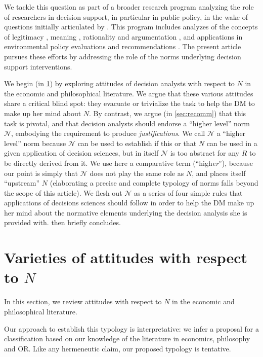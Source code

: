 \documentclass[preprint, french, english, 11pt, authoryear]{elsarticle}%
\newcommand{\protectforpdf}[1]{\texorpdfstring{\ensuremath{#1}}{#1}}
\newcommand{\adv}{\mathscr{N}}
\begin{document}
\begin{changebar}
We tackle this question as part of a broader research program analyzing the role of researchers in decision support, in particular in public policy, in the wake of questions initially articulated by \citet{tsoukias_policy_2013}.
This program includes analyzes of the concepts of legitimacy \citep{meinard_what_2017}, meaning \citep{meinard_utility_2018}, rationality \citep{meinard_rationality_2019} and argumentation \citep{cailloux_formal_2018}, 
and applications in environmental policy evaluations \citep{jeanmougin_mismatch_2017} and recommendations \citep{choulak_meta-decision-analysis_2019}.
The present article pursues these efforts by addressing the role of the norms underlying decision support interventions.\end{changebar}

We begin (in \cref{sec:existing}) by exploring attitudes of decision analysts with respect to $N$ in the economic and philosophical literature. 
We argue that these various attitudes share a critical blind spot: they evacuate or trivialize the task to help the \ac{DM} to make up her mind about $N$. 
By contrast, we argue (in \cref{sec:recomm}) that this task is pivotal, and that decision analysts should endorse a “higher level” norm $\adv$, embodying the requirement to produce \emph{justifications}. 
We call $\adv$ a “higher level” norm because $\adv$ can be used to establish if this or that $N$ can be used in a given application of decision sciences, but in itself $\adv$ is too abstract for any $R$ to be directly derived from it.
We use here a comparative term (“high\emph{er}”), because our point is simply that $\adv$ does not play the same role as $N$, and places itself “upstream” $N$ (elaborating a precise and complete typology of norms falls beyond the scope of this article).
We flesh out $\adv$ as a series of four simple rules that applications of decisions sciences should follow in order to help the \ac{DM} make up her mind about the normative elements underlying the decision analysis she is provided with.  then briefly concludes.

\section{Varieties of attitudes with respect to \protectforpdf{N}}
\label{sec:existing}
In this section, we review attitudes with respect to $N$ in the economic and philosophical literature.
\begin{changebar}
Our approach to establish this typology is interpretative: we infer a proposal for a classification based on our knowledge of the literature in economics, philosophy and \ac{OR}.
Like any hermeneutic claim, our proposed typology is tentative.\end{changebar}
\end{document}
